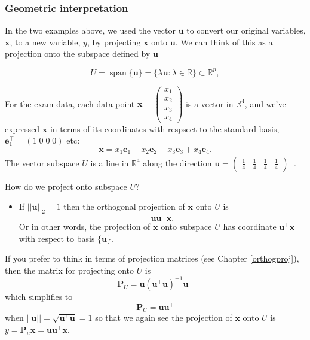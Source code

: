 \documentclass[]{book}
\providecommand{\tightlist}{%
  \setlength{\itemsep}{0pt}\setlength{\parskip}{0pt}}
\theoremstyle{definition}
\theoremstyle{definition}
\theoremstyle{definition}
\theoremstyle{remark}
\begin{document}
\hypertarget{geometric-interpretation}{%
\subsubsection*{Geometric interpretation}\label{geometric-interpretation}}

In the two examples above, we used the vector \(\mathbf u\) to convert our original variables, \(\mathbf x\),
to a new variable, \(y\), by projecting \(\mathbf x\) onto \(\mathbf u\).
We can think of this as a projection onto the subspace defined by \(\mathbf u\)

\[U = \operatorname{span}\{\mathbf u\} = \{\lambda \mathbf u: \lambda \in \mathbb{R}\}\subset \mathbb{R}^p,\]

For the exam data, each data point \(\mathbf x= \begin{pmatrix} x_1 \\ x_2 \\ x_3 \\ x_4 \end{pmatrix}\)
is a vector in \(\mathbb{R}^4\), and we've expressed \(\mathbf x\) in terms of its coordinates with respsect to the standard basis, \(\mathbf e_1^\top = (1\; 0\; 0 \; 0)\) etc:
\[\mathbf x=x_1 \mathbf e_1 + x_2 \mathbf e_2 +x_3 \mathbf e_3 +x_4 \mathbf e_4.\]
The vector subspace \(U\) is a line in \(\mathbb{R}^4\) along the direction \(\mathbf u= \begin{pmatrix} \frac{1}{4} & \frac{1}{4} & \frac{1}{4} & \frac{1}{4} \end{pmatrix}^\top\).

How do we project onto subspace \(U\)?

\begin{itemize}
\tightlist
\item
  If \(||\mathbf u||_2=1\) then the orthogonal projection of \(\mathbf x\) onto \(U\) is\\
  \[\mathbf u\mathbf u^\top\mathbf x.\]
  Or in other words, the projection of \(\mathbf x\) onto subspace \(U\) has coordinate \(\mathbf u^\top \mathbf x\) with respect to basis \(\{\mathbf u\}\).
\end{itemize}

If you prefer to think in terms of projection matrices (see Chapter \ref{orthogproj}), then the matrix for projecting onto \(U\) is
\[\mathbf P_U = \mathbf u(\mathbf u^\top \mathbf u)^{-1}\mathbf u^\top\]
which simplifies to
\[\mathbf P_U = \mathbf u\mathbf u^\top\]
when \(||\mathbf u||=\sqrt{\mathbf u^\top\mathbf u}=1\) so that we again see the projection of \(\mathbf x\) onto \(U\) is \(y=\mathbf P_u \mathbf x= \mathbf u\mathbf u^\top\mathbf x\).
\end{document}
